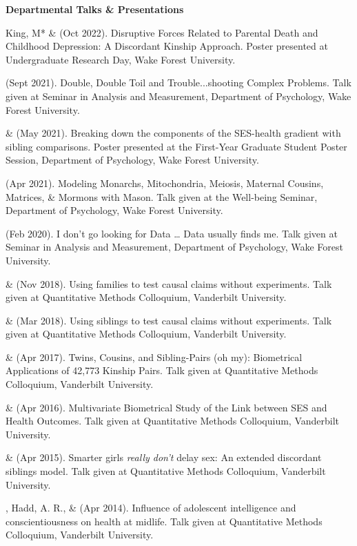 {\large \bf Departmental Talks \& Presentations}
\begin{etaremune}
\item King, M* \& \meb (Oct 2022). Disruptive Forces Related to Parental Death and Childhood Depression: A Discordant Kinship Approach. Poster presented at Undergraduate Research Day, Wake Forest University.

\item \meb (Sept 2021). Double, Double Toil and Trouble...shooting Complex Problems. Talk given at Seminar in Analysis and Measurement, Department of Psychology, Wake Forest University. 
%
\item \yrh \& \meb (May 2021). Breaking down the components of the SES-health gradient with sibling comparisons. Poster presented at the First-Year Graduate Student Poster Session, Department of Psychology, Wake Forest University.
%
\item\meb (Apr 2021). Modeling Monarchs, Mitochondria, Meiosis, Maternal Cousins, Matrices, \& Mormons with Mason. Talk given at the Well-being Seminar, Department of Psychology, Wake Forest University. 
%
\item\meb (Feb 2020). I don't go looking for Data … Data usually finds me. Talk given at Seminar in Analysis and Measurement, Department of Psychology, Wake Forest University. 
%
\item\meb \& \Joe (Nov 2018). Using families to test causal claims without experiments. Talk given at Quantitative Methods Colloquium, Vanderbilt University. 
%
\item\meb \& \Joe (Mar 2018). Using siblings to test causal claims without experiments. Talk given at Quantitative Methods Colloquium, Vanderbilt University.
%
\item\meb \& \Joe (Apr 2017). Twins, Cousins, and Sibling-Pairs (oh my): Biometrical Applications of 42,773 Kinship Pairs. Talk given at Quantitative Methods Colloquium, Vanderbilt University. %
%
\item\meb \& \Joe (Apr 2016). Multivariate Biometrical Study of the Link between SES and Health Outcomes. Talk given at Quantitative Methods Colloquium, Vanderbilt University.
%
\item\meb \& \Joe (Apr 2015). Smarter girls \textit{really don't} delay sex: An extended discordant siblings model. Talk given at Quantitative Methods Colloquium, Vanderbilt University.
\item\meb, Hadd, A. R., \& \Joe (Apr 2014). Influence of adolescent intelligence and conscientiousness on health at midlife. Talk given at Quantitative Methods Colloquium, Vanderbilt University. 

\end{etaremune}
